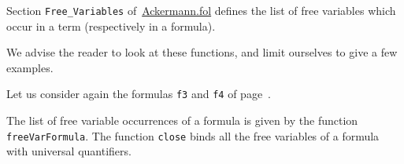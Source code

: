 Section \texttt{Free\_Variables} 
of~\href{../theories/html/hydras.Ackermann.fol.html}{Ackermann.fol} defines the list of free variables which occur in a term (respectively in a formula).

We advise the reader to look at these functions, and limit ourselves to give a few examples.

Let us consider again the formulas \texttt{f3} and \texttt{f4} of page~\pageref{fol:examplesf1f2f3}.

The list of free variable occurrences of a formula is given by the function \texttt{freeVarFormula}. The function \texttt{close}
binds all the free variables of a formula with universal quantifiers.






